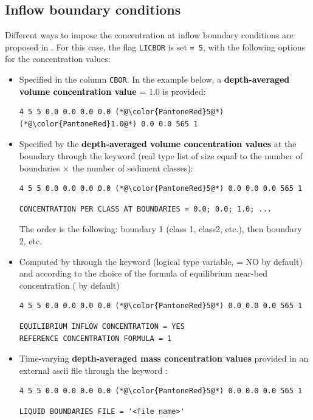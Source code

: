 \subsection{Inflow boundary conditions}
Different ways to impose the concentration at inflow boundary conditions are proposed in \gaia. For this case, the flag \texttt{LICBOR} is set \texttt{= 5}, with the following options for the concentration values:
\begin{itemize}
\item Specified in the column \texttt{CBOR}. In the example below, a \textcolor{black}{\textbf{depth-averaged volume concentration value}} {\ttfamily = 1.0} is provided:
\begin{lstlisting}[frame=trBL]
4 5 5 0.0 0.0 0.0 0.0 (*@\color{PantoneRed}5@*) (*@\color{PantoneRed}1.0@*) 0.0 0.0 565 1
\end{lstlisting}
\item Specified by the \textcolor{black}{\textbf{depth-averaged volume concentration values}} at the boundary through the keyword  (real type list of size equal to the number of boundaries $\times$ the number of sediment classes):
\begin{lstlisting}[frame=trBL]
4 5 5 0.0 0.0 0.0 0.0 (*@\color{PantoneRed}5@*) 0.0 0.0 0.0 565 1
\end{lstlisting}
\begin{lstlisting}[frame=trBL]
CONCENTRATION PER CLASS AT BOUNDARIES = 0.0; 0.0; 1.0; ...
\end{lstlisting}
The order is the following: boundary 1 (class 1, class2, etc.), then boundary 2, etc.
\item Computed by \gaia{} through the keyword  (logical type variable, {\ttfamily = NO} by default) and according to the choice of the formula of equilibrium near-bed concentration ( by default)
\begin{lstlisting}[frame=trBL]
4 5 5 0.0 0.0 0.0 0.0 (*@\color{PantoneRed}5@*) 0.0 0.0 0.0 565 1
\end{lstlisting}
\begin{lstlisting}[frame=trBL]
EQUILIBRIUM INFLOW CONCENTRATION = YES
REFERENCE CONCENTRATION FORMULA = 1
\end{lstlisting}
\item Time-varying {\textbf{depth-averaged mass concentration values}} provided in an external ascii file through the keyword :
\begin{lstlisting}[frame=trBL]
4 5 5 0.0 0.0 0.0 0.0 (*@\color{PantoneRed}5@*) 0.0 0.0 0.0 565 1
\end{lstlisting}
\begin{lstlisting}[frame=trBL]
LIQUID BOUNDARIES FILE = '<file name>'
\end{lstlisting}
\end{itemize}


